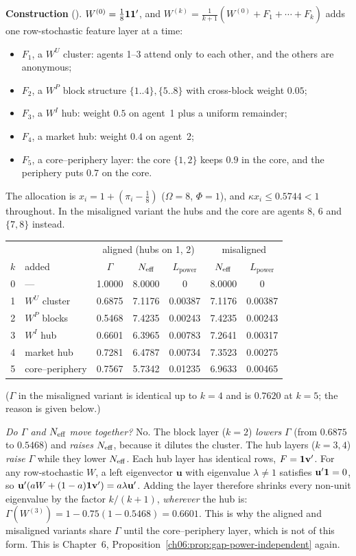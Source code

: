 \documentclass[../solutions_manual.tex]{subfiles}
\begin{document}
\textbf{Construction} (\illustrative). $W^{(0)} = \frac18\mathbf{1}\mathbf{1}'$, and $W^{(k)} = \frac{1}{k+1}(W^{(0)} + F_1 + \cdots + F_k)$ adds one row-stochastic feature layer at a time:
\begin{itemize}
\item $F_1$, a $W^U$ cluster: agents 1--3 attend only to each other, and the others are anonymous;
\item $F_2$, a $W^P$ block structure $\{1..4\},\{5..8\}$ with cross-block weight $0.05$;
\item $F_3$, a $W^I$ hub: weight $0.5$ on agent~1 plus a uniform remainder;
\item $F_4$, a market hub: weight $0.4$ on agent~2;
\item $F_5$, a core--periphery layer: the core $\{1,2\}$ keeps $0.9$ in the core, and the periphery puts $0.7$ on the core.
\end{itemize}
The allocation is $x_i = 1 + (\pi_i - \frac18)$ ($\Omega = 8$, $\Phi = 1$), and $\kappa x_i \le 0.5744 < 1$ throughout. In the misaligned variant the hubs and the core are agents 8, 6 and $\{7, 8\}$ instead.
\begin{center}
\begin{tabular}{clccc|cc}
\toprule
& & \multicolumn{3}{c|}{aligned (hubs on 1, 2)} & \multicolumn{2}{c}{misaligned}\\
$k$ & added & $\Gamma$ & $N_{\text{eff}}$ & $L_{\text{power}}$ & $N_{\text{eff}}$ & $L_{\text{power}}$\\
\midrule
0 & --- & 1.0000 & 8.0000 & 0 & 8.0000 & 0\\
1 & $W^U$ cluster & 0.6875 & 7.1176 & 0.00387 & 7.1176 & 0.00387\\
2 & $W^P$ blocks & 0.5468 & 7.4235 & 0.00243 & 7.4235 & 0.00243\\
3 & $W^I$ hub & 0.6601 & 6.3965 & 0.00783 & 7.2641 & 0.00317\\
4 & market hub & 0.7281 & 6.4787 & 0.00734 & 7.3523 & 0.00275\\
5 & core--periphery & 0.7567 & 5.7342 & 0.01235 & 6.9633 & 0.00465\\
\bottomrule
\end{tabular}
\end{center}
($\Gamma$ in the misaligned variant is identical up to $k = 4$ and is $0.7620$ at $k = 5$; the reason is given below.)

\emph{Do $\Gamma$ and $N_{\text{eff}}$ move together?} No. The block layer ($k = 2$) \emph{lowers} $\Gamma$ (from $0.6875$ to $0.5468$) and \emph{raises} $N_{\text{eff}}$, because it dilutes the cluster. The hub layers ($k = 3, 4$) \emph{raise} $\Gamma$ while they lower $N_{\text{eff}}$. Each hub layer has identical rows, $F = \mathbf{1}\mathbf v'$. For any row-stochastic $W$, a left eigenvector $\mathbf u$ with eigenvalue $\lambda \ne 1$ satisfies $\mathbf u'\mathbf{1} = 0$, so $\mathbf u'(aW + (1-a)\mathbf{1}\mathbf v') = a\lambda\mathbf u'$. Adding the layer therefore shrinks every non-unit eigenvalue by the factor $k/(k+1)$, \emph{wherever} the hub is: $\Gamma(W^{(3)}) = 1 - 0.75(1 - 0.5468) = 0.6601$. This is why the aligned and misaligned variants share $\Gamma$ until the core--periphery layer, which is not of this form. This is Chapter~6, Proposition~\ref{ch06:prop:gap-power-independent} again.
\end{document}
